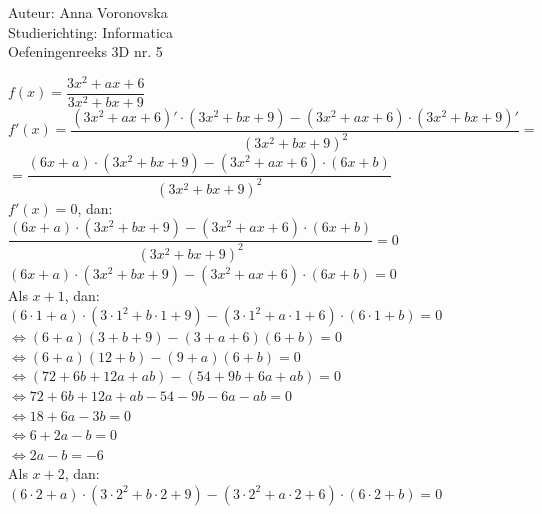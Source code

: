 \documentclass[a4paper]{article}
\begin{document}
\noindent \large Auteur: Anna Voronovska \\
\noindent \large Studierichting: Informatica \\
\noindent \large Oefeningenreeks 3D nr. 5 \\

\bigskip 

\normalsize

$f(x)= \dfrac{3x^2+ax+6}{3x^2+bx+9}$\\

$f'(x)=\dfrac{(3x^2+ax+6)' \cdot (3x^2+bx+9)-(3x^2+ax+6)\cdot(3x^2+bx+9)'}{(3x^2+bx+9)^2}=$\\

$= \dfrac{(6x+a)\cdot(3x^2+bx+9)-(3x^2+ax+6)\cdot (6x+b)}{(3x^2+bx+9)^2}$\\

$f'(x)=0$, dan:\\

$\dfrac{(6x+a)\cdot(3x^2+bx+9)-(3x^2+ax+6)\cdot (6x+b)}{(3x^2+bx+9)^2}=0$\\

$(6x+a)\cdot(3x^2+bx+9)-(3x^2+ax+6)\cdot (6x+b) = 0$\\

Als $x+1$, dan:\\

$(6 \cdot 1 +a)\cdot(3 \cdot 1^2+b\cdot 1+9)-(3\cdot 1^2+a \cdot 1+6)\cdot (6\cdot 1+b)=0$\\

$\Leftrightarrow (6+a)(3+b+9)-(3+a+6)(6+b)=0$\\

$\Leftrightarrow (6+a)(12+b)-(9+a)(6+b)=0$\\

$\Leftrightarrow (72+6b+12a+ab)-(54+9b+6a+ab)=0$\\

$\Leftrightarrow 72+6b+12a+ab-54-9b-6a-ab=0$\\

$\Leftrightarrow 18+6a-3b=0$\\

$\Leftrightarrow 6+2a-b=0$\\

$\Leftrightarrow 2a-b=-6$\\

Als $x+2$, dan:\\

$(6 \cdot 2 +a)\cdot(3 \cdot 2^2+b\cdot 2+9)-(3\cdot 2^2+a \cdot 2+6)\cdot (6\cdot 2+b)=0$\\
\end{document}

